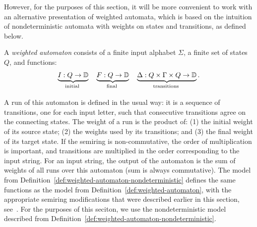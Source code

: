 However, for the purposes of this section, it  will be more convenient to work with an alternative presentation of weighted automata, which is based on the intuition of nondeterministic automata with weights on states and transitions, as defined below. 
\begin{definition}
    \label{def:weighted-automaton-nondeterministic}
    A \emph{weighted automaton} consists of a finite input alphabet $\Sigma$,  a finite set of states $Q$, and functions: 
    \begin{align*}
    \myunderbrace{I : Q \to \domain}{initial}
    \quad
    \myunderbrace{F : Q \to \domain}{final}
    \quad
    \myunderbrace{\Delta : Q \times \Gamma \times Q \to \domain}{transitions}.
    \end{align*}
\end{definition}
 A run of this automaton is defined in the usual way: it is a sequence of transitions, one for each input letter, such that consecutive transitions agree on the connecting states. The weight of a run is the product of: (1) the initial weight of its source state; (2) the weights used by its transitions; and (3) the final weight of its target state. If the semiring is non-commutative, the order of multiplication is  important, and transitions are multiplied in the order corresponding to the input string. For an input string, the output of the automaton is the sum of weights of all runs over this automaton (sum is always commutative).  The model from Definition~\ref{def:weighted-automaton-nondeterministic}  defines the same functions as the model from Definition~\ref{def:weighted-automaton}, with the appropriate semiring modifications that were described earlier in this section, see~\cite[Lemma 8.3]{bojanczyk_automata_2025}. For the purposes of this seciton, we use the nondeterministic  model described from Definition~\ref{def:weighted-automaton-nondeterministic}.



